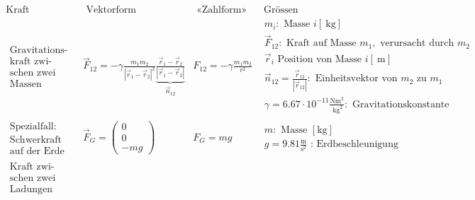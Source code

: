 \begin{center}
\begin{equation*}
\begin{array}{|c|c|c|c|}
\hline \text { Kraft } & \text { Vektorform } & \text { «Zahlform» } & \text { Grössen } \\
\hline \begin{array}{l}
\text { Gravitations- } \\
\text { kraft zwi- } \\
\text { schen zwei } \\
\text { Massen }
\end{array} & \vec{F}_{12}=-\gamma \frac{m_1 m_2}{\left|\vec{r}_1-\vec{r}_2\right|^2} \underbrace{\frac{\vec{r}_1-\vec{r}_2}{\left|\vec{r}_1-\vec{r}_2\right|}}_{\vec{n}_{12}} & F_{12}=-\gamma \frac{m_1 m_2}{r^2} & \begin{array}{l}
m_i: \text { Masse } i[\mathrm{~kg}] \\
\vec{F}_{12}: \text { Kraft auf Masse } m_1, \text { verursacht durch } m_2 \\
\vec{r}_i \text { Position von Masse } i[\mathrm{~m}] \\
\vec{n}_{12}=\frac{\vec{r}_{12}}{\left|\vec{r}_{12}\right|}: \text { Einheitsvektor von } m_2 \text { zu } m_1 \\
\gamma=6.67 \cdot 10^{-11} \frac{\mathrm{Nm}^2}{\mathrm{~kg}^2}: \text { Gravitationskonstante }
\end{array} \\
\hline \begin{array}{l}
\text { Spezialfall: } \\
\text { Schwerkraft } \\
\text { auf der Erde }
\end{array} & \vec{F}_G=\left(\begin{array}{c}
0 \\
0 \\
-m g
\end{array}\right) & F_G=m g & \begin{array}{l}
m: \text { Masse }[\mathrm{kg}] \\
g=9.81 \frac{\mathrm{m}}{\mathrm{s}^2} \text { : Erdbeschleunigung }
\end{array} \\
\hline \begin{array}{l}
\text { Kraft zwi- } \\
\text { schen zwei } \\
\text { Ladungen } \\

\end{array}
\end{array}
\end{equation*}
\end{center}
